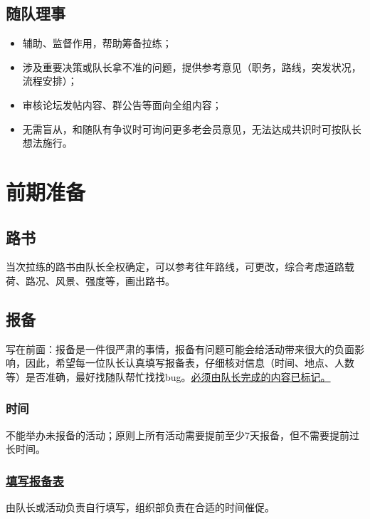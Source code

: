 \documentclass[UTF8]{ctexart}
\begin{document}
\subsection{随队理事}

\begin{itemize}[nosep,left=2em]
    \item 辅助、监督作用，帮助筹备拉练；
    \item 涉及重要决策或队长拿不准的问题，提供参考意见（职务，路线，突发状况，流程安排）；
    \item 审核论坛发帖内容、群公告等面向全组内容；
    \item 无需盲从，和随队有争议时可询问更多老会员意见，无法达成共识时可按队长想法施行。
    
\end{itemize}

\section{前期准备}

\subsection{路书}

当次拉练的路书由队长全权确定，可以参考往年路线，可更改，综合考虑道路载荷、路况、风景、强度等，画出路书。

\subsection{报备}

写在前面：报备是一件很严肃的事情，报备有问题可能会给活动带来很大的负面影响，因此，希望每一位队长认真填写报备表，仔细核对信息（时间、地点、人数等）是否准确，最好找随队帮忙找找bug。\underline{必须由队长完成的内容已标记。}

\subsubsection{时间}

不能举办未报备的活动；原则上所有活动需要提前至少7天报备，但不需要提前过长时间。

\subsubsection[填写报备表]{\underline{填写报备表}}

由队长或活动负责自行填写，组织部负责在合适的时间催促。
\end{document}

